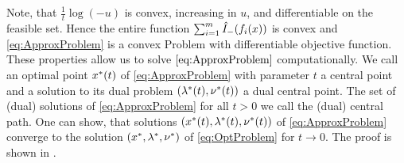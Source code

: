 Note, that $ \frac{1}{t}\log(-u) $ is convex, increasing in $ u $, and differentiable on the feasible set. Hence the entire function $ \sum_{i=1}^{m} {\hat{I}}_{\mathrm{-}}(f_i(x)) $ is convex and \eqref{eq:ApproxProblem} is a convex Problem with differentiable objective function. These properties allow us to solve $ \eqref{eq:ApproxProblem} $ computationally.
We call an optimal point $ x^*(t) $ of \eqref{eq:ApproxProblem} with parameter $ t $  a central point and a solution to its dual problem $ (\lambda^*(t),\nu^*(t)) $ a dual central point. The set of (dual) solutions of \eqref{eq:ApproxProblem} for all $ t>0 $ we call the (dual) central path.
One can show, that solutions $ (x^*(t),\lambda^*(t),\nu^*(t)) $ of \eqref{eq:ApproxProblem} converge to the solution  $ (x^*,\lambda^*, \nu^*) $ of \eqref{eq:OptProblem} for $ t  \longrightarrow 0 $. The proof is shown in \cite{BV}.
\label{sec:BarrierConcept}
